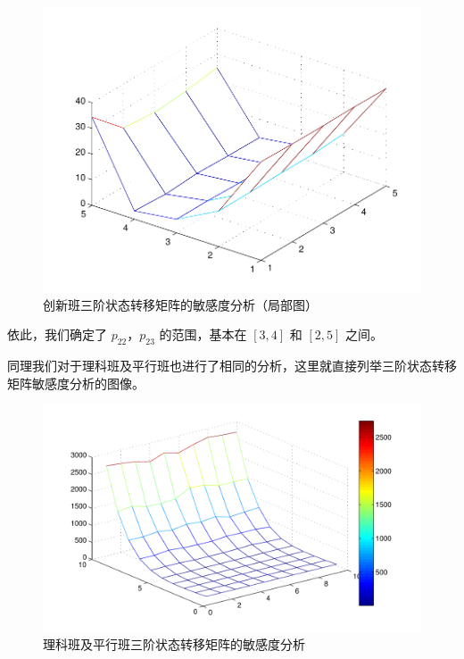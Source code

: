 \documentclass[a4paper]{article}
\begin{document}
  \begin{figure}[H]
  \centerline{\includegraphics[scale=0.7]{inno3part.pdf}}
  \caption{创新班三阶状态转移矩阵的敏感度分析（局部图）}
  \end{figure}

  依此，我们确定了 $p_{22}$，$p_{23}$ 的范围，基本在 $[3,4]$ 和 $[2,5]$ 之间。

  同理我们对于理科班及平行班也进行了相同的分析，这里就直接列举三阶状态转移矩阵敏感度分析的图像。

  \begin{figure}[H]
  \centerline{\includegraphics[scale=0.7]{norm3.pdf}}
  \caption{理科班及平行班三阶状态转移矩阵的敏感度分析}
  \end{figure}
\end{document}
